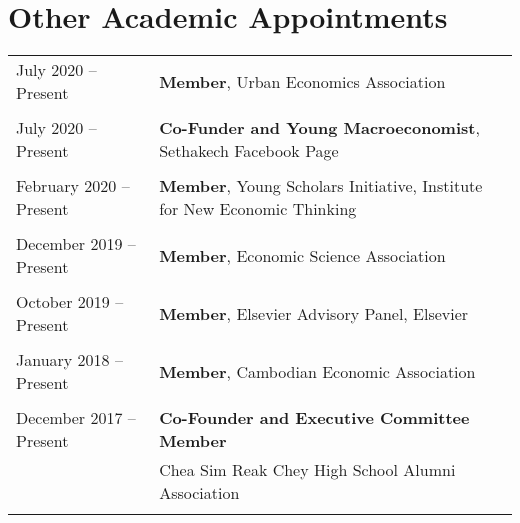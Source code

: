 \documentclass[10pt,a4paper]{article}
\begin{document}
	\section*{Other Academic Appointments}
	\noindent 
		\begin{tabular}{@{} l l}
			\vspace{-1em}
			\hspace{1em} July 2020 -- Present & \textbf{Member}, Urban Economics Association	\\
			& \\ 
			
			\vspace{-1em}
			\hspace{1em} July 2020 -- Present & \textbf{Co-Funder and Young Macroeconomist}, Sethakech Facebook Page\\
			& \\ 
			
			\vspace{-1em}
			\hspace{1em} February 2020 -- Present & \textbf{Member}, Young Scholars Initiative, Institute for New Economic Thinking\\
			& \\
			
			
			\vspace{-1em}
			\hspace{1em} December 2019 -- Present & \textbf{Member}, Economic Science Association\\
			& \\ 
			\vspace{-1em}
			
			\hspace{1em} October 2019 -- Present	& \textbf{Member}, Elsevier Advisory Panel, Elsevier \\
			& \\ 
			\vspace{-1em}
			
			\hspace{1em} January 2018 -- Present	& \textbf{Member}, Cambodian Economic Association \\
			& \\
			
			\hspace{1em} December 2017 -- Present    & \textbf{Co-Founder and Executive Committee Member} \\
			& Chea Sim Reak Chey High School Alumni Association \\
			& \vspace{-1em} \\
			
		\end{tabular}
	
\end{document}

